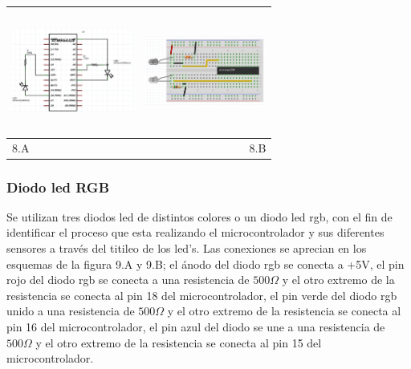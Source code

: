 \documentclass[12]{article}
\newenvironment{Figure}
{\par\medskip\noindent\minipage{\linewidth}}
{\endminipage\par\medskip}
\begin{document}
\begin{multicols}{2}
\begin{Figure}
\center
\begin{tabular}{|l|r|}
\hline
\includegraphics[width=4cm, height=4cm]{img/ledesq.png} & \includegraphics[width=4cm, height=4cm]{img/ledmont.png} \\ \hline
8.A & 8.B \\ \hline
\end{tabular}
\label{fig:g8}
\end{Figure}

\subsubsection{Diodo led RGB}
Se utilizan tres diodos led de distintos colores o un diodo led rgb, con el fin de identificar el proceso que esta realizando el microcontrolador y sus diferentes sensores a través del titileo de los led's.
Las conexiones se aprecian en los esquemas de la figura 9.A y 9.B;  el ánodo del diodo rgb se conecta a +5V, el pin rojo del diodo rgb se conecta a una resistencia de $500\Omega$ y el otro extremo de la resistencia se conecta al pin 18 del microcontrolador, el pin verde del diodo rgb unido a una resistencia de $500\Omega$ y el otro extremo de la resistencia se conecta al pin 16 del microcontrolador, el pin azul del diodo se une a una resistencia de $500\Omega$ y el otro extremo de la resistencia se conecta al pin 15 del microcontrolador.\\


\end{multicols}
\end{document}

